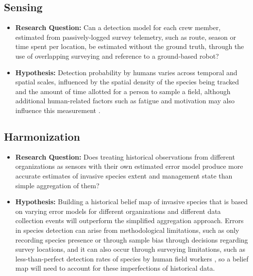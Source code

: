 \documentclass{article}
\begin{document}
\subsection{Sensing}

    \begin{itemize}
        \item \textbf{Research Question:} Can a detection model for each crew member, estimated from passively-logged survey telemetry, such as route, season or time spent per location, be estimated without the ground truth, through the use of overlapping surveying and reference to a ground-based robot?

        \item \textbf{Hypothesis:} Detection probability by humans varies across temporal and spatial scales, influenced by the spatial density of the species being tracked and the amount of time allotted for a person to sample a field, although additional human-related factors such as fatigue and motivation may also influence this measurement \cite{plants-stand-still-but-hide}.
    \end{itemize}


\subsection{Harmonization}

    \begin{itemize}
        \item \textbf{Research Question:} Does treating historical observations from different organizations as sensors with their own estimated error model produce more accurate estimates of invasive species extent and management state than simple aggregation of them?

        \item \textbf{Hypothesis:} Building a historical belief map of invasive species that is based on varying error models for different organizations and different data collection events will outperform the simplified aggregation approach. Errors in species detection can arise from methodological limitations, such as only recording species presence or through sample bias through decisions regarding survey locations, and it can also occur through surveying limitations, such as less-than-perfect detection rates of species by human field workers \cite{practical-guide-for-combining-data}, so a belief map will need to account for these imperfections of historical data.

    \end{itemize}
\end{document}
